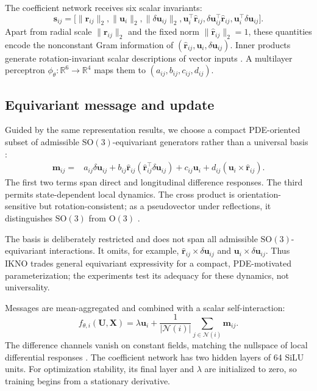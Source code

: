 \documentclass[mlmain]{jmlr}
\newcommand{\R}{\mathbb{R}}
\newcommand{\SO}{\mathrm{SO}(3)}
\newcommand{\IKNO}{\textsc{IKNO}}
\begin{document}
The coefficient network receives six scalar invariants:
\begin{equation}
 \boldsymbol{s}_{ij}=\big[
 \|\boldsymbol{r}_{ij}\|_2,
 \|\boldsymbol{u}_i\|_2,
 \|\delta\boldsymbol{u}_{ij}\|_2,
 \boldsymbol{u}_i^\top\widehat{\boldsymbol{r}}_{ij},
 \delta\boldsymbol{u}_{ij}^\top\widehat{\boldsymbol{r}}_{ij},
 \boldsymbol{u}_i^\top\delta\boldsymbol{u}_{ij}
 \big].
 \label{eq:invariants}
\end{equation}
Apart from radial scale $\|\boldsymbol r_{ij}\|_2$ and the fixed norm
$\|\widehat{\boldsymbol r}_{ij}\|_2=1$, these quantities encode the nonconstant
Gram information of
$(\widehat{\boldsymbol r}_{ij},\boldsymbol u_i,\delta\boldsymbol u_{ij})$.
Inner products generate rotation-invariant scalar descriptions of vector
inputs \citep{villar2021scalars}. A multilayer perceptron
$\phi_\theta:\R^6\rightarrow\R^4$ maps them to
$(a_{ij},b_{ij},c_{ij},d_{ij})$.

\subsection{Equivariant message and update}

Guided by the same representation results, we choose a compact PDE-oriented
subset of admissible $\SO$-equivariant generators rather than a universal
basis \citep{smith1971isotropic,villar2021scalars}:
\begin{align}
 \boldsymbol{m}_{ij}
 ={}&a_{ij}\delta\boldsymbol{u}_{ij}
 +b_{ij}\widehat{\boldsymbol{r}}_{ij}
       (\widehat{\boldsymbol{r}}_{ij}^{\top}\delta\boldsymbol{u}_{ij})
 +c_{ij}\boldsymbol{u}_i
 +d_{ij}(\boldsymbol{u}_i\times\widehat{\boldsymbol{r}}_{ij}).
 \label{eq:message}
\end{align}
The first two terms span direct and longitudinal difference responses. The
third permits state-dependent local dynamics. The cross product is
orientation-sensitive but rotation-consistent; as a pseudovector under
reflections, it distinguishes $\SO$ from $\mathrm O(3)$
\citep{villar2021scalars}.

The basis is deliberately restricted and does not span all admissible
$\SO$-equivariant interactions. It omits, for example,
$\widehat{\boldsymbol r}_{ij}\times\delta\boldsymbol u_{ij}$ and
$\boldsymbol u_i\times\delta\boldsymbol u_{ij}$. Thus \IKNO{} trades general
equivariant expressivity for a compact, PDE-motivated parameterization; the
experiments test its adequacy for these dynamics, not universality.

Messages are mean-aggregated and combined with a scalar self-interaction:
\begin{equation}
 f_{\theta,i}(\boldsymbol{U},\boldsymbol{X})
 =\lambda\boldsymbol{u}_i
 +\frac{1}{|\mathcal{N}(i)|}
  \sum_{j\in\mathcal{N}(i)}\boldsymbol{m}_{ij}.
 \label{eq:update}
\end{equation}
The difference channels vanish on constant fields, matching the nullspace of
local differential responses \citep{brandstetter2022message,jenner2022steerable}.
The coefficient network has two hidden layers of 64 SiLU units. For optimization
stability, its final layer and $\lambda$ are initialized to zero, so training
begins from a stationary derivative.
\end{document}

